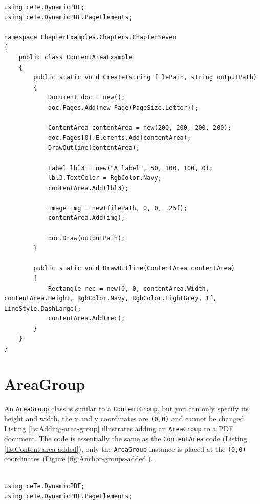 \documentclass[american,letterpaper]{tufte-book}
\numberwithin{equation}{section}
\numberwithin{figure}{section}
\begin{document}
{\begin{lstlisting}[caption={Content area added to PDF.},label={lis:Content-area-added},basicstyle={\small\ttfamily},breaklines=true]
using ceTe.DynamicPDF;
using ceTe.DynamicPDF.PageElements;

namespace ChapterExamples.Chapters.ChapterSeven
{
    public class ContentAreaExample
    {
        public static void Create(string filePath, string outputPath)
        {
            Document doc = new();
            doc.Pages.Add(new Page(PageSize.Letter));

            ContentArea contentArea = new(200, 200, 200, 200);
            doc.Pages[0].Elements.Add(contentArea);
            DrawOutline(contentArea);

            Label lbl3 = new("A label", 50, 100, 100, 0);
            lbl3.TextColor = RgbColor.Navy;
            contentArea.Add(lbl3);

            Image img = new(filePath, 0, 0, .25f);
            contentArea.Add(img);

            doc.Draw(outputPath);
        }

        public static void DrawOutline(ContentArea contentArea)
        {
            Rectangle rec = new(0, 0, contentArea.Width, contentArea.Height, RgbColor.Navy, RgbColor.LightGrey, 1f, LineStyle.DashLarge);
            contentArea.Add(rec);
        }
    }
}
\end{lstlisting}
\leavevmode\egroup


\section{AreaGroup}\label{subsec:AreaGroup}

An \texttt{AreaGroup} class is similar to a \texttt{ContentGroup},
but you can only specify its height and width, the x and y coordinates
are  \texttt{(0,0)} and cannot be changed. Listing \ref{lis:Adding-area-group} illustrates adding an \texttt{AreaGroup}
to a PDF document. The code is essentially the same as the \texttt{ContentArea}
code (Listing \ref{lis:Content-area-added}), only the \texttt{AreaGroup}
instance is placed at the \texttt{(0,0)} coordinates (Figure \ref{fig:Anchor-groups-added}).

\bgroup{}
\begin{lstlisting}[caption={Adding area group to a PDF.},label={lis:Adding-area-group},basicstyle={\small\ttfamily},breaklines=true]

using ceTe.DynamicPDF;
using ceTe.DynamicPDF.PageElements;


\end{lstlisting}}
\end{document}
